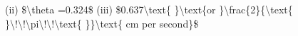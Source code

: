\item (ii) \$\textbackslash theta =0.324\$ (iii) \$0.637\textbackslash text\{
\}\textbackslash text\{or \}\textbackslash frac\{2\}\{\textbackslash text\{
\}\textbackslash !\textbackslash !\textbackslash pi\textbackslash !\textbackslash !\textbackslash text\{
\}\}\textbackslash text\{ cm per second\}\$